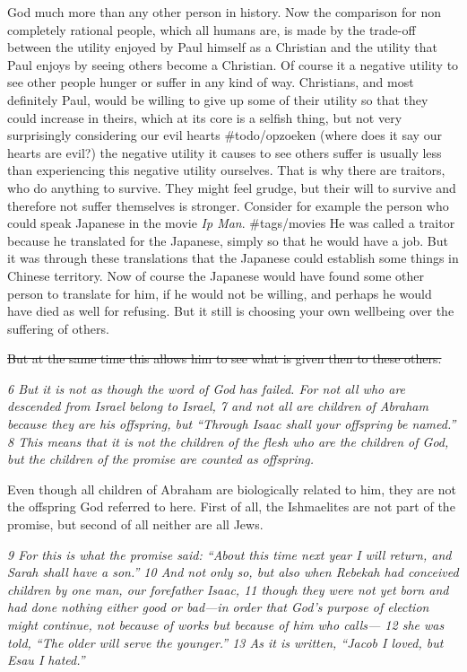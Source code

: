 God much more than any other person in history. Now the comparison for
non completely rational people, which all humans are, is made by the
trade-off between the utility enjoyed by Paul himself as a Christian and
the utility that Paul enjoys by seeing others become a Christian. Of
course it a negative utility to see other people hunger or suffer in any
kind of way. Christians, and most definitely Paul, would be willing to
give up some of their utility so that they could increase in theirs,
which at its core is a selfish thing, but not very surprisingly
considering our evil hearts \#todo/opzoeken (where does it say our
hearts are evil?) the negative utility it causes to see others suffer is
usually less than experiencing this negative utility ourselves. That is
why there are traitors, who do anything to survive. They might feel
grudge, but their will to survive and therefore not suffer themselves is
stronger. Consider for example the person who could speak Japanese in
the movie \emph{Ip Man}. \#tags/movies He was called a traitor because
he translated for the Japanese, simply so that he would have a job. But
it was through these translations that the Japanese could establish some
things in Chinese territory. Now of course the Japanese would have found
some other person to translate for him, if he would not be willing, and
perhaps he would have died as well for refusing. But it still is
choosing your own wellbeing over the suffering of others.

\sout{But at the same time this allows him to see what is given then to
these others.}

\emph{6 But it is not as though the word of God has failed. For not all
who are descended from Israel belong to Israel, 7 and not all are
children of Abraham because they are his offspring, but ``Through Isaac
shall your offspring be named.'' 8 This means that it is not the
children of the flesh who are the children of God, but the children of
the promise are counted as offspring.}

Even though all children of Abraham are biologically related to him,
they are not the offspring God referred to here. First of all, the
Ishmaelites are not part of the promise, but second of all neither are
all Jews.

\emph{9 For this is what the promise said: ``About this time next year I
will return, and Sarah shall have a son.'' 10 And not only so, but also
when Rebekah had conceived children by one man, our forefather Isaac, 11
though they were not yet born and had done nothing either good or
bad---in order that God's purpose of election might continue, not
because of works but because of him who calls--- 12 she was told, ``The
older will serve the younger.'' 13 As it is written, ``Jacob I loved,
but Esau I hated.''}

